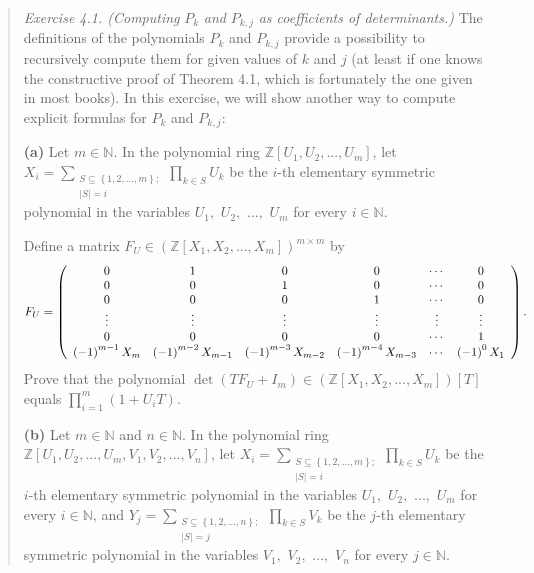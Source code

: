 \documentclass[numbers=enddot,12pt,final,onecolumn,notitlepage]{scrartcl}%
\begin{document}
\begin{quotation}
\textit{Exercise 4.1. (Computing }$P_{k}$ \textit{and }$P_{k,j}$ \textit{as
coefficients of determinants.)} The definitions of the polynomials $P_{k}$ and
$P_{k,j}$ provide a possibility to recursively compute them for given values
of $k$ and $j$ (at least if one knows the constructive proof of Theorem 4.1,
which is fortunately the one given in most books). In this exercise, we will
show another way to compute explicit formulas for $P_{k}$ and $P_{k,j}$:

\textbf{(a)} Let $m\in\mathbb{N}$. In the polynomial ring $\mathbb{Z}\left[
U_{1},U_{2},...,U_{m}\right]  $, let $X_{i}=\sum\limits_{\substack{S\subseteq
\left\{  1,2,...,m\right\}  ;\\\left\vert S\right\vert =i}}\prod\limits_{k\in
S}U_{k}$ be the $i$-th elementary symmetric polynomial in the variables
$U_{1},$ $U_{2},$ $...,$ $U_{m}$ for every $i\in\mathbb{N}$.

Define a matrix $F_{U}\in\left(  \mathbb{Z}\left[  X_{1},X_{2},...,X_{m}%
\right]  \right)  ^{m\times m}$ by%
\[
F_{U}=\left(
\begin{array}
[c]{cccccc}%
0 & 1 & 0 & 0 & \cdots & 0\\
0 & 0 & 1 & 0 & \cdots & 0\\
0 & 0 & 0 & 1 & \cdots & 0\\
\vdots & \vdots & \vdots & \vdots & \vdots & \vdots\\
0 & 0 & 0 & 0 & \cdots & 1\\
\left(  -1\right)  ^{m-1}X_{m} & \left(  -1\right)  ^{m-2}X_{m-1} & \left(
-1\right)  ^{m-3}X_{m-2} & \left(  -1\right)  ^{m-4}X_{m-3} & \cdots & \left(
-1\right)  ^{0}X_{1}%
\end{array}
\right)  .
\]
Prove that the polynomial $\det\left(  TF_{U}+I_{m}\right)  \in\left(
\mathbb{Z}\left[  X_{1},X_{2},...,X_{m}\right]  \right)  \left[  T\right]  $
equals $\prod\limits_{i=1}^{m}\left(  1+U_{i}T\right)  $.

\textbf{(b)} Let $m\in\mathbb{N}$ and $n\in\mathbb{N}$. In the polynomial ring
$\mathbb{Z}\left[  U_{1},U_{2},...,U_{m},V_{1},V_{2},...,V_{n}\right]  $, let
$X_{i}=\sum\limits_{\substack{S\subseteq\left\{  1,2,...,m\right\}
;\\\left\vert S\right\vert =i}}\prod\limits_{k\in S}U_{k}$ be the $i$-th
elementary symmetric polynomial in the variables $U_{1},$ $U_{2},$ $...,$
$U_{m}$ for every $i\in\mathbb{N}$, and $Y_{j}=\sum
\limits_{\substack{S\subseteq\left\{  1,2,...,n\right\}  ;\\\left\vert
S\right\vert =j}}\prod\limits_{k\in S}V_{k}$ be the $j$-th elementary
symmetric polynomial in the variables $V_{1},$ $V_{2},$ $...,$ $V_{n}$ for
every $j\in\mathbb{N}$.


\end{quotation}
\end{document}
